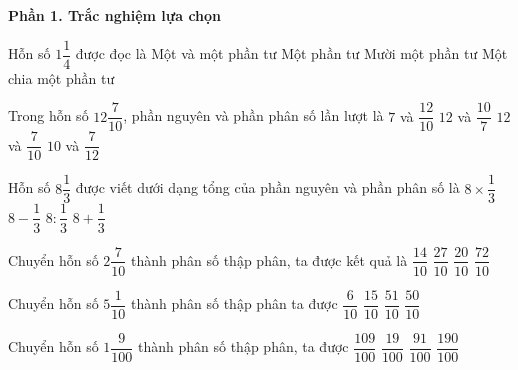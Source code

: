 \textbf{Phần 1. Trắc nghiệm lựa chọn}

\begin{ex} %
Hỗn số $1\dfrac{1}{4}$ được đọc là
\choice
{\True Một và một phần tư}
{Một phần tư}
{Mười một phần tư}
{Một chia một phần tư}
\end{ex}

\begin{ex} %
Trong hỗn số $12\dfrac{7}{10}$, phần nguyên và phần phân số lần lượt là
\choice
{$7$ và $\dfrac{12}{10}$}
{$12$ và $\dfrac{10}{7}$}
{\True $12$ và $\dfrac{7}{10}$}
{$10$ và $\dfrac{7}{12}$}
\end{ex}

\begin{ex} %
Hỗn số $8\dfrac{1}{3}$ được viết dưới dạng tổng của phần nguyên và phần phân số là
\choice
{$8 \times \dfrac{1}{3}$}
{$8 - \dfrac{1}{3}$}
{$8 : \dfrac{1}{3}$}
{\True $8 + \dfrac{1}{3}$}
\end{ex}

\begin{ex} %
Chuyển hỗn số $2\dfrac{7}{10}$ thành phân số thập phân, ta được kết quả là
\choice
{$\dfrac{14}{10}$}
{\True $\dfrac{27}{10}$}
{$\dfrac{20}{10}$}
{$\dfrac{72}{10}$}
\end{ex}

\begin{ex} %
Chuyển hỗn số $5\dfrac{1}{10}$ thành phân số thập phân ta được
\choice
{$\dfrac{6}{10}$}
{$\dfrac{15}{10}$}
{\True $\dfrac{51}{10}$}
{$\dfrac{50}{10}$}
\end{ex}

\begin{ex} %
Chuyển hỗn số $1\dfrac{9}{100}$ thành phân số thập phân, ta được
\choice
{\True $\dfrac{109}{100}$}
{$\dfrac{19}{100}$}
{$\dfrac{91}{100}$}
{$\dfrac{190}{100}$}
\end{ex}

